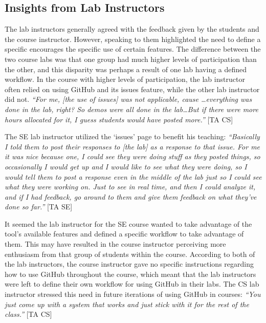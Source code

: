 

\subsection{Insights from Lab Instructors}
The lab instructors generally agreed with the feedback given by the students and the course instructor. However, speaking to them highlighted the need to define a specific encourages the specific use of certain features. The difference between the two course labs was that one group had much higher levels of participation than the other, and this disparity was perhaps a result of one lab having a defined workflow. In the course with higher levels of participation, the lab instructor often relied on using GitHub and its issues feature, while the other lab instructor did not. \textit{``For me, [the use of issues] was not applicable, cause \ldots everything was done in the lab, right? So demos were all done in the lab\ldots But if there were more hours allocated for it, I guess students would have posted more.''} [TA CS]

The SE lab instructor utilized the `issues' page to benefit his teaching: \textit{``Basically I told them to post their responses to [the lab] as a response to that issue. For me it was nice because one, I could see they were doing stuff as they posted things, so occasionally I would get up and I would like to see what they were doing, so I would tell them to post a response even in the middle of the lab just so I could see what they were working on. Just to see in real time, and then I could analyze it, and if I had feedback, go around to them and give them feedback on what they've done so far.''} [TA SE]

It seemed the lab instructor for the SE course wanted to take advantage of the tool's available features and defined a specific workflow to take advantage of them. This may have resulted in the course instructor perceiving more enthusiasm from that group of students within the course. According to both of the lab instructors, the course instructor gave no specific instructions regarding how to use GitHub throughout the course, which meant that the lab instructors were left to define their own workflow for using GitHub in their labs. The CS lab instructor stressed this need in future iterations of using GitHub in courses: \textit{``You just come up with a system that works and just stick with it for the rest of the class.''} [TA CS]

